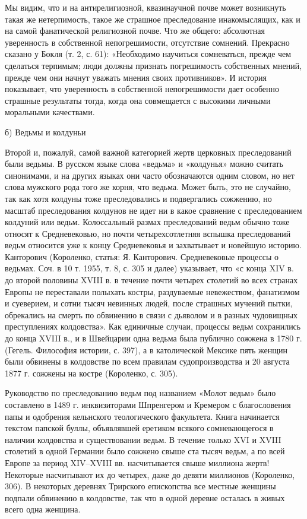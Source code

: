 Мы  видим,   что  и  на  антирелигиозной,   квазинаучной  почве  может
возникнуть  такая же  нетерпимость,  такое  же страшное  преследование
инакомыслящих,  как и  на  самой фанатической  религиозной почве.  Что
же  общего:  абсолютная   уверенность  в  собственной  непогрешимости,
отсутствие  сомнений.  Прекрасно  сказано  у  Бокля  (т.  2,  с.  61):
«Необходимо научиться сомневаться, прежде чем сделаться терпимым; люди
должны  признать  погрешимость  собственных  мнений,  прежде  чем  они
начнут  уважать  мнения  своих  противников».  И  история  показывает,
что уверенность  в собственной  непогрешимости дает  особенно страшные
результаты тогда, когда она  совмещается с высокими личными моральными
качествами.

б) Ведьмы и колдуньи

Второй   и,  пожалуй,   самой   важной   категорией  жертв   церковных
преследований были ведьмы. В русском языке слова «ведьма» и «колдунья»
можно считать  синонимами, и на  других языках они  часто обозначаются
одним словом,  но нет слова мужского  рода того же корня,  что ведьма.
Может быть, это не случайно,  так как хотя колдуны тоже преследовались
и подвергались сожжению, но масштаб  преследования колдунов не идет ни
в какое  сравнение с  преследованием колдуний или  ведьм. Колоссальный
размах  преследований ведьм  обычно тоже  относят к  Средневековью, но
почти  четырехсотлетняя вспышка  преследований ведьм  относится уже  к
концу  Средневековья  и  захватывает и  новейшую  историю.  Канторович
(Короленко, статья:  Я. Канторович. Средневековые процессы  о ведьмах.
Соч. в 10 т.  1955, т. 8, с. 305 и далее) указывает,  что «с конца XIV
в. до  второй половины XVIII  в. в  течение почти четырех  столетий во
всех  странах  Европы  не  переставали  полыхать  костры,  раздуваемые
невежеством,  фанатизмом и  суеверием, и  сотни тысяч  невинных людей,
после  страшных мучений  пытки, обрекались  на смерть  по обвинению  в
связи с дьяволом и в  разных чудовищных преступлениях колдовства». Как
единичные случаи,  процессы ведьм сохранились  до конца XVIII в.,  и в
Швейцарии  одна  ведьма  была  публично сожжена  в  1780  г.  (Гегель.
Философия истории, с. 397), а  в католической Мексике пять женщин были
обвинены в колдовстве  по всем правилам судопроизводства  и 20 августа
1877 г. сожжены на костре (Короленко, с. 305).

Руководство  по  преследованию  ведьм   под  названием  «Молот  ведьм»
было  составлено  в 1489  г.  инквизиторами  Шпренгером и  Кремером  с
благословения папы  и одобрения кельнского  теологического факультета.
Книга начинается  текстом папской буллы, объявлявшей  еретиком всякого
сомневающегося в  наличии колдовства и существовании  ведьм. В течение
только XVI  и XVIII столетий в  одной Германии было сожжено  свыше ста
тысяч ведьм, а  по всей Европе за период  XIV--XVIII вв. насчитывается
свыше миллиона  жертв! Некоторые  насчитывают их  до четырех,  даже до
девяти  миллионов (Короленко,  306).  В  некоторых деревнях  Трирского
епископства все  местные женщины  подпали обвинению в  колдовстве, так
что в одной деревне осталась в живых всего одна женщина.

